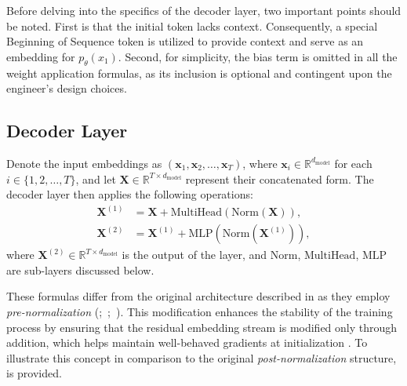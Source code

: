 Before delving into the specifics of the decoder layer, two important points should be noted. First is that the initial token lacks context. Consequently, a special Beginning of Sequence token is utilized to provide context and serve as an embedding for \(p_\theta(x_1)\). Second, for simplicity, the bias term is omitted in all the weight application formulas, as its inclusion is optional and contingent upon the engineer's design choices.

\subsection{Decoder Layer}

Denote the input embeddings as \((\mathbf{x}_1, \mathbf{x}_2, \ldots, \mathbf{x}_{T})\), where \(\mathbf{x}_i \in \mathbb{R}^{d_{\mathrm{model}}}\) for each \(i \in \{1, 2, \ldots, T\}\), and let \(\mathbf{X} \in \mathbb{R}^{T \times d_{\mathrm{model}}}\) represent their concatenated form. The decoder layer then applies the following operations:
\begin{align}
    \mathbf{X}^{(1)} &= \mathbf{X} + \mathrm{MultiHead}(\mathrm{Norm}(\mathbf{X})), \\
    \mathbf{X}^{(2)} &= \mathbf{X}^{(1)} + \mathrm{MLP}(\mathrm{Norm}(\mathbf{X}^{(1)})),
\end{align}
where \(\mathbf{X}^{(2)} \in \mathbb{R}^{T \times d_{\mathrm{model}}}\) is the output of the layer, and \(\mathrm{Norm}\), \(\mathrm{MultiHead}\), \(\mathrm{MLP}\) are sub-layers discussed below.

These formulas differ from the original architecture described in \citet{vaswani2017} as they employ \textit{pre-normalization} (\cite{baevski2018};~\cite{child2019};~\cite{wang2019}). This modification enhances the stability of the training process by ensuring that the residual embedding stream is modified only through addition, which helps maintain well-behaved gradients at initialization \parencite{xiong2020}. To illustrate this concept in comparison to the original \textit{post-normalization} structure,  is provided.

